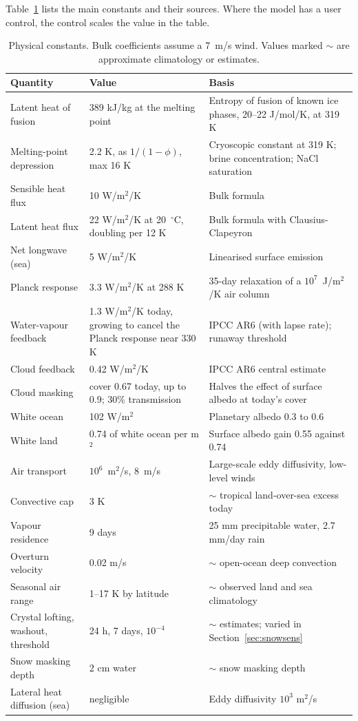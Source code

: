 \documentclass[11pt,a4paper]{article}
\newcommand{\degC}{$^{\circ}$C}
\begin{document}
Table~\ref{tab:const} lists the main constants and their sources. Where the model has a user control, the control scales the value in the table.

\begin{table}[htbp]
\centering\small
\caption{Physical constants. Bulk coefficients assume a 7~m/s wind. Values marked $\sim$ are approximate climatology or estimates.}
\label{tab:const}
\begin{tabular}{p{4.2cm}p{3.6cm}p{6.8cm}}
\toprule
Quantity & Value & Basis \\
\midrule
Latent heat of fusion & 389 kJ/kg at the melting point & Entropy of fusion of known ice phases, 20--22 J/mol/K, at 319 K \\
Melting-point depression & 2.2 K, as $1/(1-\phi)$, max 16 K & Cryoscopic constant at 319 K; brine concentration; NaCl saturation \\
Sensible heat flux & 10 W/m$^2$/K & Bulk formula \\
Latent heat flux & 22 W/m$^2$/K at 20~\degC, doubling per 12 K & Bulk formula with Clausius-Clapeyron \\
Net longwave (sea) & 5 W/m$^2$/K & Linearised surface emission \\
Planck response & 3.3 W/m$^2$/K at 288 K & 35-day relaxation of a $10^7$~J/m$^2$/K air column \\
Water-vapour feedback & 1.3 W/m$^2$/K today, growing to cancel the Planck response near 330 K & IPCC AR6 (with lapse rate); runaway threshold \\
Cloud feedback & 0.42 W/m$^2$/K & IPCC AR6 central estimate \\
Cloud masking & cover 0.67 today, up to 0.9; 30\% transmission & Halves the effect of surface albedo at today's cover \\
White ocean & 102 W/m$^2$ & Planetary albedo 0.3 to 0.6 \\
White land & 0.74 of white ocean per m$^2$ & Surface albedo gain 0.55 against 0.74 \\
Air transport & $10^6$~m$^2$/s, 8~m/s & Large-scale eddy diffusivity, low-level winds \\
Convective cap & 3 K & $\sim$ tropical land-over-sea excess today \\
Vapour residence & 9 days & 25 mm precipitable water, 2.7 mm/day rain \\
Overturn velocity & 0.02 m/s & $\sim$ open-ocean deep convection \\
Seasonal air range & 1--17 K by latitude & $\sim$ observed land and sea climatology \\
Crystal lofting, washout, threshold & 24 h, 7 days, $10^{-4}$ & $\sim$ estimates; varied in Section~\ref{sec:snowsens} \\
Snow masking depth & 2 cm water & $\sim$ snow masking depth \\
Lateral heat diffusion (sea) & negligible & Eddy diffusivity $10^3$ m$^2$/s \\
\bottomrule
\end{tabular}
\end{table}
\end{document}
